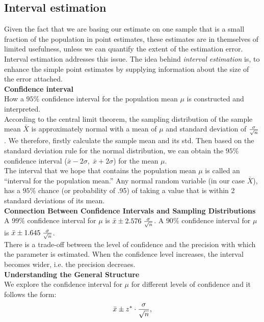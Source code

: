 \documentclass[10pt, a4paper]{article}
\begin{document}
\subsection{Interval estimation}
Given the fact that we are basing our estimate on one sample that is a small fraction of the population in point estimates, these estimates are in themselves of limited usefulness, unless we can quantify the extent of the estimation error.  Interval estimation addresses this issue. The idea behind \emph{interval estimation} is, to enhance the simple point estimates by supplying information about the size of the error attached.\\
\textbf{Confidence interval}\\
How a $95\%$ confidence interval for the population mean $\mu$ is constructed and interpreted.\\
According to the central limit theorem, the sampling distribution of the sample mean $\bar{X}$ is approximately normal with a mean of $\mu$ and standard deviation of $\sigma \over \sqrt{n}$. We therefore, firstly calculate the sample mean and its std. Then based on the standard deviation rule for the normal distribution, we can obtain the $95\%$ confidence interval ($\bar{x}- 2 \sigma, \; \bar{x}+2 \sigma$) for the mean $\mu$.\\
The interval that we hope that contains the population mean $\mu$ is called an ``interval for the population mean.''  Any normal random variable (in our case $\bar{X}$), has a $95\%$ chance (or probability of .95) of taking a value that is within 2 standard deviations of its mean.\\
\textbf{Connection Between Confidence Intervals and Sampling Distributions}\\
A $99\%$ confidence interval for $\mu$ is $\bar{x} \pm 2.576 \; {\sigma \over \sqrt{n}}$.
A $90\%$ confidence interval for $\mu$ is $\bar{x} \pm 1.645 \; {\sigma \over \sqrt{n}}$.\\
There is a trade-off between the level of confidence and the precision with which the parameter is estimated. When the confidence level increases, the interval becomes wider, i.e. the precision decreaes.\\
\textbf{Understanding the General Structure}\\
We explore the confidence interval for $\mu$ for different levels of confidence and it follows the form:
\begin{equation}
    \bar{x}\pm z^* \cdot {\sigma \over \sqrt{n}},
\end{equation}
\end{document}
